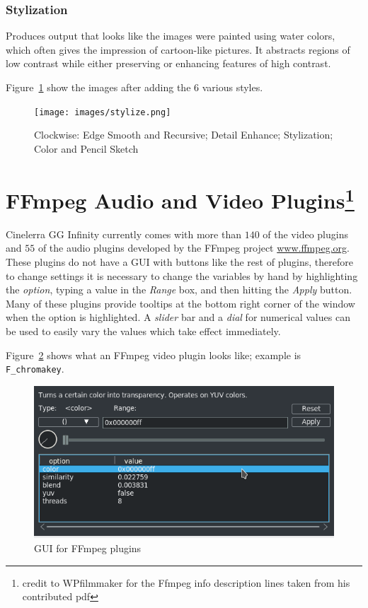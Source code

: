 \subsubsection*{Stylization}%
\label{ssub:stylization}

Produces output that looks like the images were painted using water colors, which often gives the impression of cartoon-like pictures. It abstracts regions of low contrast while either preserving or enhancing features of high contrast.

Figure~\ref{fig:stylize} show the images after adding the 6 various styles.

\begin{figure}[htpb]
    \centering
    \texttt{[image: images/stylize.png]}
    \caption{Clockwise: Edge Smooth and Recursive; Detail Enhance; Stylization; Color and Pencil Sketch}
    \label{fig:stylize}
\end{figure}

\section[FFmpeg Audio and Video Plugins]{FFmpeg Audio and Video Plugins\protect\footnote{credit to WPfilmmaker for the Ffmpeg info description lines taken from his contributed pdf}}%
\label{sec:ffmpeg_audio_video_plugins}

Cinelerra GG Infinity currently comes with more than $140$ of the video plugins and $55$ of the audio plugins developed by the FFmpeg project {\small \url{www.ffmpeg.org}}. These plugins do not have a GUI with buttons like the rest of plugins, therefore to change settings it is necessary to change the variables by hand by highlighting the \textit{option}, typing a value in the \textit{Range} box, and then hitting the \textit{Apply} button. Many of these plugins provide tooltips at the bottom right corner of the window when the option is highlighted. A \textit{slider} bar and a \textit{dial} for numerical values can be used to easily vary the values which take effect immediately.

Figure~\ref{fig:ffchromakey} shows what an FFmpeg video plugin looks like; example is \texttt{F\_chromakey}.

\begin{figure}[htpb]
    \centering
    \includegraphics[width=0.6\linewidth]{images/ffchromakey.png}
    \caption{GUI for FFmpeg plugins}
    \label{fig:ffchromakey}
\end{figure}

